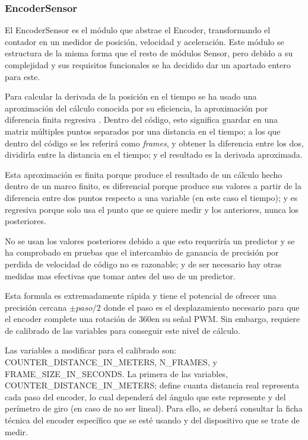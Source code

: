 \documentclass{report}
\begin{document}
\subsubsection{EncoderSensor}
El EncoderSensor es el módulo que abstrae el Encoder, transformando el contador en un medidor de posición, velocidad y aceleración. Este módulo se estructura de la misma forma que el resto de módulos Sensor, pero debido a su complejidad y sus requisitos funcionales se ha decidido dar un apartado entero para este. 
\par \vspace{0.3cm}
Para calcular la derivada de la posición en el tiempo se ha usado una aproximación del cálculo conocida por su eficiencia, la aproximación por diferencia finita regresiva \cite{web:github:EncoderWiki}. Dentro del código, esto significa guardar en una matriz múltiples puntos separados por una distancia en el tiempo; a los que dentro del código se les referirá como \textit{frames}, y obtener la diferencia entre los dos, dividirla entre la distancia en el tiempo; y el resultado es la derivada aproximada. 
\par \vspace{0.3cm}
Esta aproximación es finita porque produce el resultado de un cálculo hecho dentro de un marco finito, es diferencial porque produce sus valores a partir de la diferencia entre dos puntos respecto a una variable (en este caso el tiempo); y es regresiva porque solo usa el punto que se quiere medir y los anteriores, nunca los posteriores. \par 
No se usan los valores posteriores debido a que esto requeriría un predictor y se ha comprobado en pruebas que el intercambio de ganancia de precisión por perdida de velocidad de código no es razonable; y de ser necesario hay otras medidas mas efectivas que tomar antes del uso de un predictor. 
\par \vspace{0.3cm}
Esta formula es extremadamente rápida y tiene el potencial de ofrecer una precisión cercana ${\pm}paso/2$ donde el paso es el desplazamiento necesario para que el encoder complete una rotación de 360\textdegree en su señal PWM. Sin embargo, requiere de calibrado de las variables para conseguir este nivel de cálculo. 
\par \vspace{0.3cm}
Las variables a modificar para el calibrado son: COUNTER\_DISTANCE\_IN\_METERS, N\_FRAMES, y FRAME\_SIZE\_IN\_SECONDS. La primera de las variables, COUNTER\_DISTANCE\_IN\_METERS; define cuanta distancia real representa cada paso del encoder, lo cual dependerá del ángulo que este represente y del perímetro de giro (en caso de no ser lineal). Para ello, se deberá consultar la ficha técnica del encoder específico que se esté usando y del dispositivo que se trate de medir. \par
\end{document}

